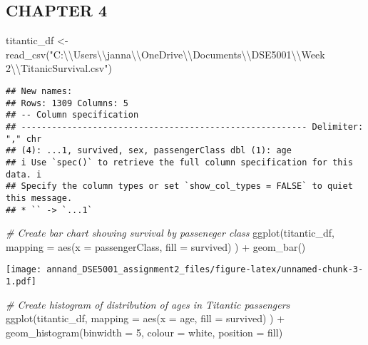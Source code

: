 \documentclass[
]{article}
\newenvironment{Shaded}{\begin{snugshade}}{\end{snugshade}}
\newcommand{\AttributeTok}[1]{\textcolor[rgb]{0.77,0.63,0.00}{#1}}
\newcommand{\CommentTok}[1]{\textcolor[rgb]{0.56,0.35,0.01}{\textit{#1}}}
\newcommand{\DecValTok}[1]{\textcolor[rgb]{0.00,0.00,0.81}{#1}}
\newcommand{\FunctionTok}[1]{\textcolor[rgb]{0.00,0.00,0.00}{#1}}
\newcommand{\NormalTok}[1]{#1}
\newcommand{\OtherTok}[1]{\textcolor[rgb]{0.56,0.35,0.01}{#1}}
\newcommand{\SpecialCharTok}[1]{\textcolor[rgb]{0.00,0.00,0.00}{#1}}
\newcommand{\StringTok}[1]{\textcolor[rgb]{0.31,0.60,0.02}{#1}}
\begin{document}
\hypertarget{chapter-4}{%
\subsection{CHAPTER 4}\label{chapter-4}}

\begin{Shaded}
\begin{Highlighting}[]
\NormalTok{titantic\_df }\OtherTok{\textless{}{-}} \FunctionTok{read\_csv}\NormalTok{(}\StringTok{"C:}\SpecialCharTok{\textbackslash{}\textbackslash{}}\StringTok{Users}\SpecialCharTok{\textbackslash{}\textbackslash{}}\StringTok{janna}\SpecialCharTok{\textbackslash{}\textbackslash{}}\StringTok{OneDrive}\SpecialCharTok{\textbackslash{}\textbackslash{}}\StringTok{Documents}\SpecialCharTok{\textbackslash{}\textbackslash{}}\StringTok{DSE5001}\SpecialCharTok{\textbackslash{}\textbackslash{}}\StringTok{Week 2}\SpecialCharTok{\textbackslash{}\textbackslash{}}\StringTok{TitanicSurvival.csv"}\NormalTok{)}
\end{Highlighting}
\end{Shaded}

\begin{verbatim}
## New names:
## Rows: 1309 Columns: 5
## -- Column specification
## -------------------------------------------------------- Delimiter: "," chr
## (4): ...1, survived, sex, passengerClass dbl (1): age
## i Use `spec()` to retrieve the full column specification for this data. i
## Specify the column types or set `show_col_types = FALSE` to quiet this message.
## * `` -> `...1`
\end{verbatim}

\begin{Shaded}
\begin{Highlighting}[]
\CommentTok{\# Create bar chart showing survival by passeneger class}
\FunctionTok{ggplot}\NormalTok{(titantic\_df,}
       \AttributeTok{mapping =} \FunctionTok{aes}\NormalTok{(}\AttributeTok{x =}\NormalTok{ passengerClass, }\AttributeTok{fill =}\NormalTok{ survived)}
\NormalTok{) }\SpecialCharTok{+} \FunctionTok{geom\_bar}\NormalTok{()}
\end{Highlighting}
\end{Shaded}

\texttt{[image: annand\_DSE5001\_assignment2\_files/figure-latex/unnamed-chunk-3-1.pdf]}

\begin{Shaded}
\begin{Highlighting}[]
\CommentTok{\# Create histogram of distribution of ages in Titantic passengers}
\FunctionTok{ggplot}\NormalTok{(titantic\_df,}
       \AttributeTok{mapping =} \FunctionTok{aes}\NormalTok{(}\AttributeTok{x =}\NormalTok{ age, }\AttributeTok{fill =}\NormalTok{ survived)}
\NormalTok{) }\SpecialCharTok{+} \FunctionTok{geom\_histogram}\NormalTok{(}\AttributeTok{binwidth =} \DecValTok{5}\NormalTok{, }\AttributeTok{colour =} \StringTok{\textquotesingle{}white\textquotesingle{}}\NormalTok{, }
                   \AttributeTok{position =} \StringTok{\textquotesingle{}fill\textquotesingle{}}\NormalTok{)}
\end{Highlighting}
\end{Shaded}
\end{document}
